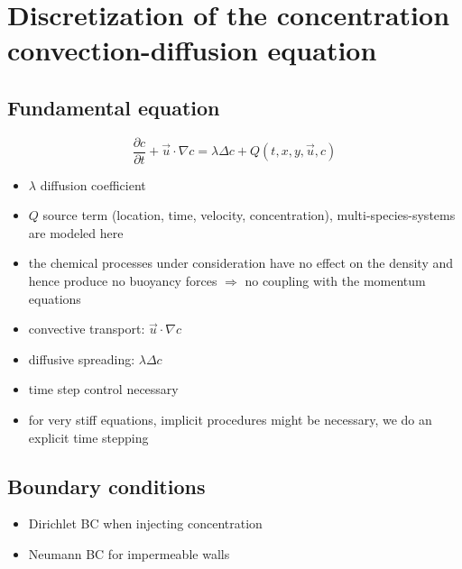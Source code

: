 \documentclass{article}
\title{
\vspace{2in}
\vspace{3in}
}
\author{\textbf{\hmwkAuthorName}}
\date{} %
\begin{document}
\section{Discretization of the concentration convection-diffusion equation}
	
\subsection{Fundamental equation}

\begin{equation}
\frac{\partial c}{\partial t} + \vec{u} \cdot \nabla c = \lambda \Delta c + Q(t,x,y,\vec{u},c)
\end{equation}
\begin{itemize}
	\item $\lambda$ diffusion coefficient
	\item $Q$ source term (location, time, velocity, concentration), multi-species-systems are modeled here
	\item the chemical processes under consideration have no effect on the density and hence produce no buoyancy forces $\Rightarrow$ no coupling with the momentum equations
	\item convective transport: $\vec{u} \cdot \nabla c$
	\item diffusive spreading: $\lambda \Delta c$
	\item time step control necessary
    \item for very stiff equations, implicit procedures might be necessary, we do an explicit time stepping
\end{itemize}

\subsection{Boundary conditions}
\begin{itemize}
	\item Dirichlet BC when injecting concentration
	\item Neumann BC for impermeable walls
\end{itemize}
\end{document}
